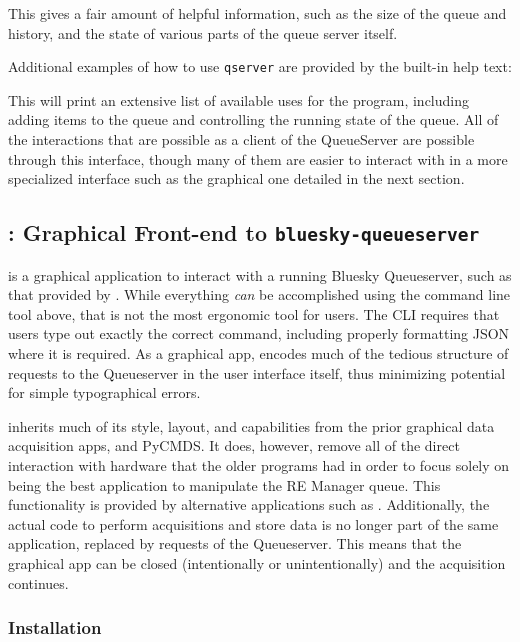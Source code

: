This gives a fair amount of helpful information, such as the size of the queue and history, and the state of various parts of the queue server itself.

Additional examples of how to use \texttt{qserver} are provided by the built-in help text:


This will print an extensive list of available uses for the program, including adding items to the queue and controlling the running state of the queue.
All of the interactions that are possible as a client of the QueueServer are possible through this interface, though many of them are easier to interact with in a more specialized interface such as the graphical one detailed in the next section.

\subsection{\blueskycmds: Graphical Front-end to \texttt{bluesky-queueserver}}

\blueskycmds is a graphical application to interact with a running Bluesky Queueserver, such as that provided by \biab.
While everything \textit{can} be accomplished using the command line tool above, that is not the most ergonomic tool for users.
The CLI requires that users type out exactly the correct command, including properly formatting JSON where it is required.
As a graphical app, \blueskycmds encodes much of the tedious structure of requests to the Queueserver in the user interface itself, thus minimizing potential for simple typographical errors.

\blueskycmds inherits much of its style, layout, and capabilities from the prior graphical data acquisition apps, \yaqccmds and PyCMDS.
It does, however, remove all of the direct interaction with hardware that the older programs had in order to focus solely on being the best application to manipulate the RE Manager queue.
This functionality is provided by alternative applications such as \yaqcqtpy.
Additionally, the actual code to perform acquisitions and store data is no longer part of the same application, replaced by requests of the Queueserver.
This means that the graphical app can be closed (intentionally or unintentionally) and the acquisition continues.

\subsubsection{Installation}

